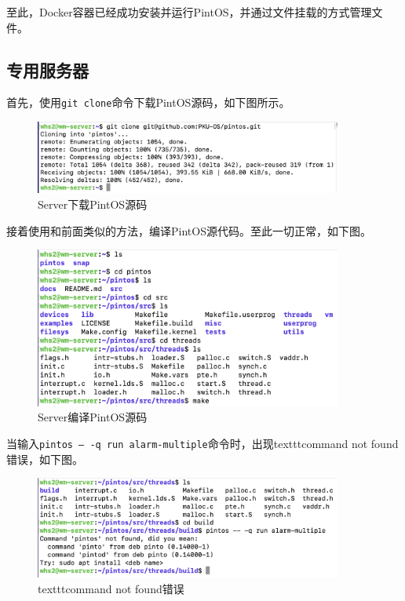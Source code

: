 \documentclass{article}
\begin{document}
至此，Docker容器已经成功安装并运行PintOS，并通过文件挂载的方式管理文件。

\subsection{专用服务器}

首先，使用\texttt{git clone}命令下载PintOS源码，如下图所示。

\begin{figure}[H]
	\centering
	\includegraphics[width=0.9\textwidth]{img/server_git.png}
	\caption{Server下载PintOS源码}
\end{figure}

接着使用和前面类似的方法，编译PintOS源代码。至此一切正常，如下图。

\begin{figure}[H]
	\centering
	\includegraphics[width=0.9\textwidth]{img/server_make_try.png}
	\caption{Server编译PintOS源码}
\end{figure}

当输入\texttt{pintos -- -q run alarm-multiple}命令时，出现texttt{command not found}错误，如下图。

\begin{figure}[H]
	\centering
	\includegraphics[width=0.9\textwidth]{img/server_command_not_found.png}
	\caption{texttt{command not found}错误}
\end{figure}
\end{document}
